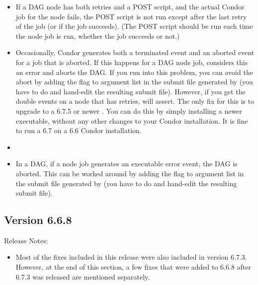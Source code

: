 \begin{itemize}

\item If a DAG node has both retries and a POST script, and the
actual Condor job for the node fails, the POST script is not
run except after the last retry of the job (or if the job
succeeds).  (The POST script should be run each time the node
job is run, whether the job succeeds or not.)

\item Occasionally, Condor generates both a terminated event and
an aborted event for a job that is aborted.  If this happens for a
DAG node job,  considers this an error
and aborts the DAG.  If you run into this problem, you can avoid
the abort by adding the  flag to argument list
in the  submit file generated by 
(you have to do   and hand-edit
the resulting submit file).  However, if you get the
double events on a node that has retries,  will assert.
The only fix for this is to upgrade to a 6.7.5 or newer .
You can do this by simply installing a newer  executable,
without any other changes to your Condor installation.  It is fine to
run a 6.7  on a 6.6 Condor installation.

\item \item In a DAG, if a node job generates an executable error event,
the DAG is aborted.  This can be worked around by adding the
 flag to argument list in the 
submit file generated by  (you have to do
  and hand-edit the resulting
submit file).

\end{itemize}


\subsection{\label{sec:New-6-6-8}Version 6.6.8}

\noindent Release Notes:

\begin{itemize}

\item Most of the fixes included in this release were also included in
  version 6.7.3.
  However, at the end of this section, a few fixes that were added to
  6.6.8 after 6.7.3 was released are mentioned separately.

\end{itemize}


